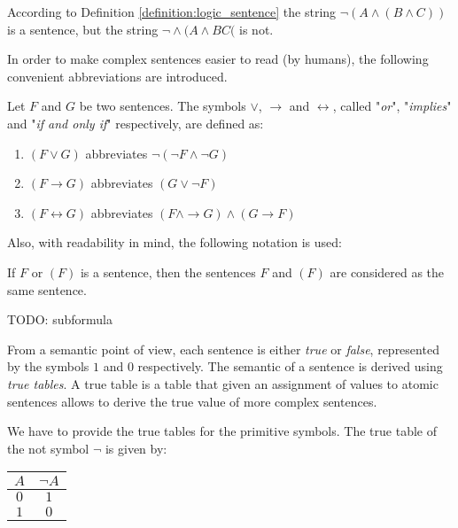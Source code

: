 According to Definition \ref{definition:logic_sentence} the string $\lnot ( A \land (B \land C) )$ is a sentence, but the string $ \lnot \land ( A \land B C ($ is not.

In order to make complex sentences easier to read (by humans), the following convenient abbreviations are introduced. 

\begin{definition}
Let $F$ and $G$ be two sentences. The symbols $\lor$, $\rightarrow$ and $\leftrightarrow$, called "\emph{or}", "\emph{implies}" and "\emph{if and only if}" respectively, are defined as:
\begin{enumerate}
\item $\left( F \lor G \right)$ abbreviates $ \lnot \left( \lnot F \land \lnot G \right)$
\item $\left( F \rightarrow G \right)$ abbreviates $\left( G \lor \lnot F \right)$
\item $\left( F \leftrightarrow G \right)$ abbreviates $ \left( F \land \rightarrow G \right) \land \left( G \rightarrow F \right)$
\end{enumerate}
\end{definition}

Also, with readability in mind, the following notation is used:

\begin{notation}
If $F$ or $\left( F \right)$ is a sentence, then the sentences $F$ and $\left( F \right)$ are considered as the same sentence.
\end{notation}

{\color{red} TODO: subformula}

From a semantic point of view, each sentence is either \emph{true} or \emph{false}, represented by the symbols $1$ and $0$ respectively. The semantic of a sentence is derived using \emph{true tables}. A true table is a table that given an assignment of values to atomic sentences allows to derive the true value of more complex sentences.

We have to provide the true tables for the primitive symbols. The true table of the not symbol $\lnot$ is given by:

\begin{center}
\begin{tabular}{ c | c }
 $A$ & $\lnot A$ \\
 \hline
 $0$ & $1$  \\  
 $1$ & $0$    
\end{tabular}
\end{center}

